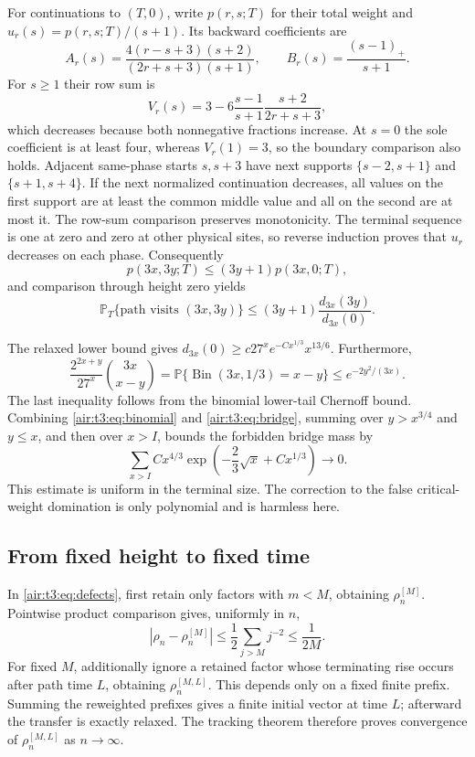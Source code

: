 \documentclass[11pt,letterpaper]{article}
\numberwithin{equation}{section}
\theoremstyle{remark}
\begin{document}
For continuations to $(T,0)$, write $p(r,s;T)$ for their total weight and $u_r(s)=p(r,s;T)/(s+1)$. Its backward coefficients are
\[
A_r(s)=\frac{4(r-s+3)(s+2)}{(2r+s+3)(s+1)},\qquad
B_r(s)=\frac{(s-1)_+}{s+1}.
\]
For $s\ge1$ their row sum is
\[
V_r(s)=3-6\frac{s-1}{s+1}\frac{s+2}{2r+s+3},
\]
which decreases because both nonnegative fractions increase. At $s=0$ the sole coefficient is at least four, whereas $V_r(1)=3$, so the boundary comparison also holds. Adjacent same-phase starts $s,s+3$ have next supports $\{s-2,s+1\}$ and $\{s+1,s+4\}$. If the next normalized continuation decreases, all values on the first support are at least the common middle value and all on the second are at most it. The row-sum comparison preserves monotonicity. The terminal sequence is one at zero and zero at other physical sites, so reverse induction proves that $u_r$ decreases on each phase. Consequently
\[
p(3x,3y;T)\le(3y+1)p(3x,0;T),
\]
and comparison through height zero yields
\begin{equation}\label{air:t3:eq:bridge}
\mathbb P_T\{\text{path visits }(3x,3y)\}
\le(3y+1)\frac{d_{3x}(3y)}{d_{3x}(0)}.
\end{equation}

The relaxed lower bound gives
$d_{3x}(0)\ge c27^x e^{-Cx^{1/3}}x^{13/6}$.
Furthermore,
\[
\frac{2^{2x+y}}{27^x}\binom{3x}{x-y}
=\mathbb P\{\operatorname{Bin}(3x,1/3)=x-y\}
\le e^{-2y^2/(3x)}.
\]
The last inequality follows from the binomial lower-tail Chernoff bound. Combining \eqref{air:t3:eq:binomial} and \eqref{air:t3:eq:bridge}, summing over $y>x^{3/4}$ and $y\le x$, and then over $x>I$, bounds the forbidden bridge mass by
\begin{equation}\label{air:t3:eq:uniformtail}
\sum_{x>I} Cx^{4/3}
\exp\left(-\frac23\sqrt x+Cx^{1/3}\right)\longrightarrow0.
\end{equation}
This estimate is uniform in the terminal size. The correction to the false critical-weight domination is only polynomial and is harmless here.

\subsection{From fixed height to fixed time}\label{air:t3:subsec:fixedtime}
In \eqref{air:t3:eq:defects}, first retain only factors with $m<M$, obtaining $\rho_n^{[M]}$. Pointwise product comparison gives, uniformly in $n$,
\[
|\rho_n-\rho_n^{[M]}|\le\frac12\sum_{j>M}j^{-2}\le\frac1{2M}.
\]
For fixed $M$, additionally ignore a retained factor whose terminating rise occurs after path time $L$, obtaining $\rho_n^{[M,L]}$. This depends only on a fixed finite prefix. Summing the reweighted prefixes gives a finite initial vector at time $L$; afterward the transfer is exactly relaxed. The tracking theorem therefore proves convergence of $\rho_n^{[M,L]}$ as $n\to\infty$.
\end{document}
